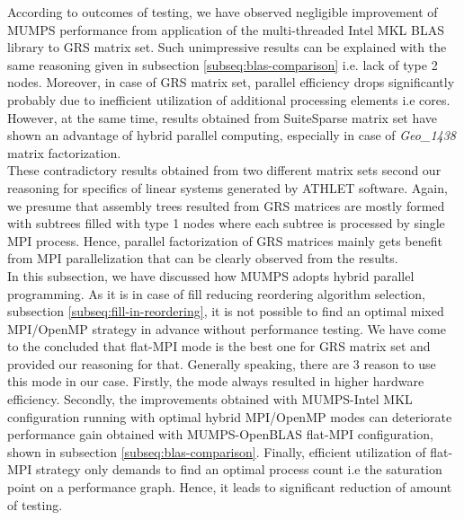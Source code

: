 According to outcomes of testing, we have observed negligible improvement of MUMPS performance from application of the multi-threaded Intel MKL BLAS library to GRS matrix set. Such unimpressive results can be explained with the same reasoning given in subsection \ref{subseq:blas-comparison} i.e. lack of type 2 nodes. Moreover, in case of GRS matrix set, parallel efficiency drops significantly probably due to inefficient utilization of additional processing elements i.e cores. However, at the same time, results obtained from SuiteSparse matrix set have shown an advantage of hybrid parallel computing, especially in case of \textit{Geo\_1438} matrix factorization.\\


These contradictory results obtained from two different matrix sets second our reasoning for specifics of linear systems generated by ATHLET software. Again, we presume that   assembly trees resulted from GRS matrices are mostly formed with subtrees filled with type 1 nodes where each subtree is processed by single MPI process. Hence, parallel factorization of GRS matrices mainly gets benefit from MPI parallelization that can be clearly observed from the results.\\



In this subsection, we have discussed how MUMPS adopts hybrid parallel programming. As it is in case of fill reducing reordering algorithm selection, subsection \ref{subseq:fill-in-reordering}, it is not possible to find an optimal mixed MPI/OpenMP strategy in advance without performance testing. We have come to the concluded that flat-MPI mode is the best one for GRS matrix set and provided our reasoning for that. Generally speaking, there are 3 reason to use this mode in our case. Firstly, the mode always resulted in higher hardware efficiency. Secondly, the improvements obtained with MUMPS-Intel MKL configuration running with optimal hybrid MPI/OpenMP modes can deteriorate performance gain obtained with MUMPS-OpenBLAS flat-MPI configuration, shown in subsection \ref{subseq:blas-comparison}. Finally, efficient utilization of flat-MPI strategy only demands to find an optimal process count i.e the saturation point on a performance graph. Hence, it leads to significant reduction of amount of testing. \\